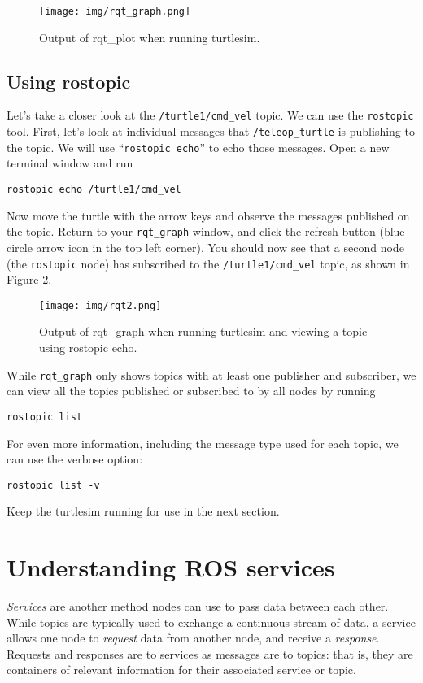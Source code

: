\documentclass{article}
\begin{document}
\begin{figure}[h]
\centering
\texttt{[image: img/rqt\_graph.png]}
\caption{Output of rqt\_plot when running turtlesim.}
\label{rqt}
\end{figure}

\subsection{Using rostopic}
Let's take a closer look at the \verb=/turtle1/cmd_vel= topic. We can use the \verb=rostopic= tool. First, let's look at individual messages that \verb=/teleop_turtle= is publishing to the topic. We will use ``\verb=rostopic echo='' to echo those messages. Open a new terminal window and run
\begin{Verbatim}[frame=single]
rostopic echo /turtle1/cmd_vel
\end{Verbatim}

Now move the turtle with the arrow keys and observe the messages published on the topic. Return to your \verb=rqt_graph= window, and click the refresh button (blue circle arrow icon in the top left corner). You should now see that a second node (the \verb=rostopic= node) has subscribed to the \verb=/turtle1/cmd_vel= topic, as shown in Figure \ref{rqt2}.

\begin{figure}[h]
\centering
\texttt{[image: img/rqt2.png]}
\caption{Output of rqt\_graph when running turtlesim and viewing a topic using rostopic echo.}
\label{rqt2}
\end{figure}

While \verb=rqt_graph= only shows topics with at least one publisher and subscriber, we can view all the topics published or subscribed to by all nodes by running
\begin{Verbatim}[frame=single]
rostopic list
\end{Verbatim}

For even more information, including the message type used for each topic, we can use the verbose option:
\begin{Verbatim}[frame=single]
rostopic list -v
\end{Verbatim}

Keep the turtlesim running for use in the next section.

\section{Understanding ROS services}
\emph{Services} are another method nodes can use to pass data between each other. While topics are typically used to exchange a continuous stream of data, a service allows one node to \emph{request} data from another node, and receive a \emph{response}. Requests and responses are to services as messages are to topics: that is, they are containers of relevant information for their associated service or topic.
\end{document}
